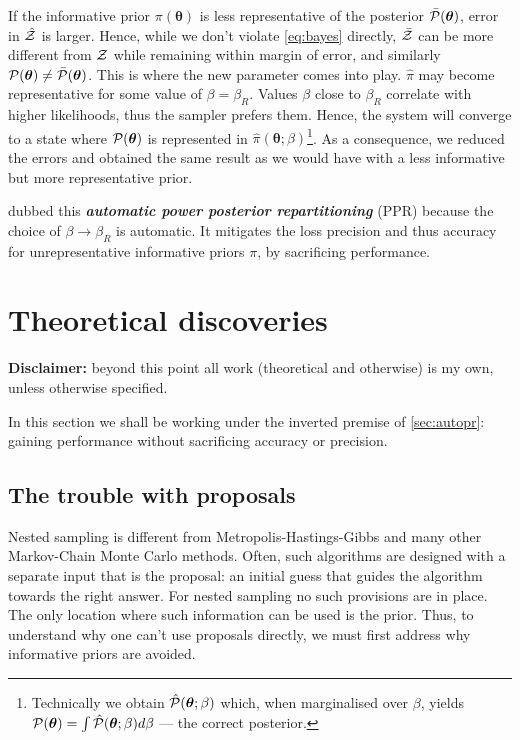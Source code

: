 \documentclass[usenatbib]{mnras}
\begin{document}
If the informative prior \(\pi (\bm{\theta})\) is less representative
of the posterior \( \bar{\cal P} (\bm{\theta})\), error in
$\hat{\cal Z}$ is larger. Hence, while we don't violate
\cref{eq:bayes} directly, $\bar{\cal Z}$ can be more different from
${\cal Z}$ while remaining within margin of error, and similarly
${\cal P}(\bm{\theta}) \ne \bar{\cal P}(\bm{\theta})$. This is where
the new parameter comes into play. $\hat{\pi}$ may become
representative for some value of $\beta = \beta_{R}$. Values $\beta$
close to $\beta_{R}$ correlate with higher likelihoods, thus the
sampler prefers them. Hence, the system will converge to a state where
\( {\cal P} (\bm{\theta})\) is represented in
\(\hat{\pi} (\bm{\theta};\beta)\)\footnote{Technically we obtain
  \( \hat{\cal P} (\bm{\theta};\beta)\) which, when marginalised over
  $\beta$, yields
  \( {\cal P} (\bm{\theta}) = \int \hat{\cal P} (\bm{\theta};\beta) d
  \beta\) --- the correct posterior.}.  As a consequence, we reduced
the errors and obtained the same result as we would have with a less
informative but more representative prior.

\cite{chen-ferroz-hobson} dubbed this \textbf{\emph{automatic power posterior
  repartitioning}} (PPR) because the choice of
$\beta\rightarrow\beta_{R}$ is automatic. It mitigates the loss
precision and thus accuracy for unrepresentative informative priors
$\pi$, by sacrificing performance.

\pagebreak[2]
\section{Theoretical discoveries}
\textbf{Disclaimer:} beyond this point all work (theoretical and
otherwise) is my own, unless otherwise specified.

In this section we shall be working under the inverted premise of
\cref{sec:autopr}: gaining performance without sacrificing accuracy or
precision.

\subsection{The trouble with proposals\label{sec:prejudice}}

Nested sampling is different from Metropolis-Hastings-Gibbs and many
other Markov-Chain Monte Carlo methods. Often, such algorithms are
designed with a separate input that is the proposal: an initial guess
that guides the algorithm towards the right answer.  For nested
sampling no such provisions are in place. The only location where such
information can be used is the prior.  Thus, to understand why one
can't use proposals directly, we must first address why informative
priors are avoided.
\end{document}

